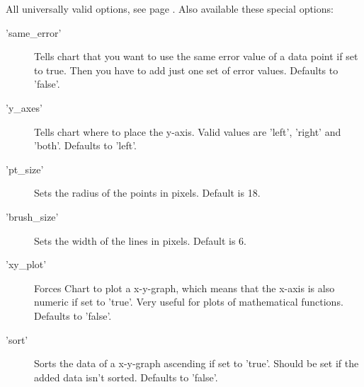 \Attributes
All universally valid options, see page \pageref{options}. Also available these special options:
\begin{description}
\item['same\_error'] Tells chart that you want to use the same error value of a data point 
     if set to true. 
     Then you have to add just one set of error values. Defaults to 'false'.
     
\item['y\_axes'] Tells chart where to place the y-axis. 
     Valid values are 'left', 'right' and 'both'. Defaults to 'left'.

\item['pt\_size']Sets the radius of the points in pixels. Default is 18.

\item['brush\_size']Sets the width of the lines in pixels. Default is 6.

\item['xy\_plot']Forces Chart to plot a x-y-graph, 
      which means that the x-axis is also numeric if set to 'true'. 
      Very useful for plots of mathematical functions. Defaults to 'false'.

\item['sort']Sorts the data of a x-y-graph ascending if set to 'true'. 
      Should be set if the added data isn't sorted. Defaults to 'false'. 
\end{description}
